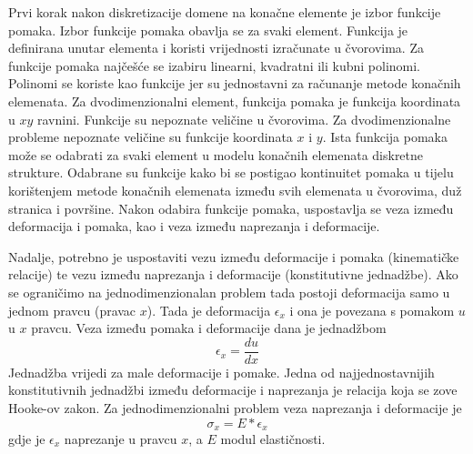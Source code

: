 \documentclass[a4paper,twoside,12pt]{memoir} %
\begin{document}
Prvi korak nakon diskretizacije domene na konačne elemente je izbor funkcije pomaka. Izbor funkcije pomaka obavlja se za svaki element. Funkcija je definirana unutar elementa i koristi vrijednosti izračunate u čvorovima. Za funkcije pomaka najčešće se izabiru linearni, kvadratni ili kubni polinomi. Polinomi se koriste kao funkcije jer su jednostavni za računanje metode konačnih elemenata. Za dvodimenzionalni element, funkcija pomaka je funkcija koordinata u $xy$ ravnini. Funkcije su nepoznate veličine u čvorovima. Za dvodimenzionalne probleme nepoznate veličine su funkcije koordinata $x$ i $y$.
Ista funkcija pomaka može se odabrati za svaki element u modelu konačnih elemenata diskretne strukture. Odabrane su funkcije kako bi se postigao kontinuitet pomaka u tijelu korištenjem metode konačnih elemenata između svih elemenata u čvorovima, duž stranica i površine. Nakon odabira funkcije pomaka, uspostavlja se veza između deformacija i pomaka, kao i veza između naprezanja i deformacije. \par

Nadalje, potrebno je uspostaviti vezu između deformacije i pomaka (kinematičke relacije) te vezu između naprezanja i deformacije (konstitutivne jednadžbe). Ako se ograničimo na jednodimenzionalan problem tada postoji deformacija samo u jednom pravcu (pravac $x$). Tada je deformacija $\epsilon_x$ i ona je povezana s pomakom $u$ u $x$ pravcu. Veza između pomaka i deformacije dana je jednadžbom
\begin{equation}
    \label{eq:veza_pomaka_deformacije}
	\epsilon_x = \frac{du}{dx}
\end{equation}
Jednadžba vrijedi za male deformacije i pomake. Jedna od najjednostavnijih konstitutivnih jednadžbi između deformacije i naprezanja je relacija koja se zove Hooke-ov zakon. Za jednodimenzionalni problem veza naprezanja i deformacije je 
\begin{equation}
    \label{eq:veza_naprezanja_deformacije}
    \sigma_x = E * \epsilon_x
\end{equation}
gdje je $\epsilon_x$ naprezanje u pravcu $x$, a $E$ modul elastičnosti. \par
\end{document}
